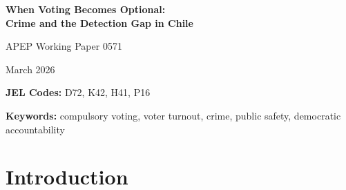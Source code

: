 \documentclass[12pt]{article}
\begin{document}
\begin{titlepage}
\centering
\vspace*{1.5cm}

{\LARGE\bfseries When Voting Becomes Optional:\\Crime and the Detection Gap in Chile\par}

\vspace{1.0cm}

{\large APEP Working Paper 0571\par}
\vspace{0.3cm}
{\large March 2026\par}

\vspace{1.2cm}

\begin{abstract}
\noindent Chile's 2012 electoral reform replaced compulsory voting with voluntary participation, reducing average turnout by 35.6 percentage points across 346 comunas. Using a continuous-treatment difference-in-differences design exploiting cross-comuna variation in turnout decline, I find that comunas losing more voters experienced large declines in police-detected crimes---drug offenses fell 4.7\% and burglary 1.6\% per percentage point of turnout decline---yet homicide, which requires no police initiative to detect, rose 1.3\% per point. This divergence between police-initiated and always-reported crimes is consistent with a ``detection gap'': reduced democratic accountability appears to have weakened policing effort rather than improved safety. The results are robust to inverse hyperbolic sine transformation, tipolog\'{i}a-by-year fixed effects, covariate-by-post interactions, and randomization inference. The findings suggest that compulsory voting may sustain public safety through the accountability channel that keeps police resources directed toward underserved communities.
\end{abstract}

\vspace{0.6cm}

\noindent\textbf{JEL Codes:} D72, K42, H41, P16

\noindent\textbf{Keywords:} compulsory voting, voter turnout, crime, public safety, democratic accountability

\end{titlepage}

\section{Introduction}\label{sec:introduction}
\end{document}
